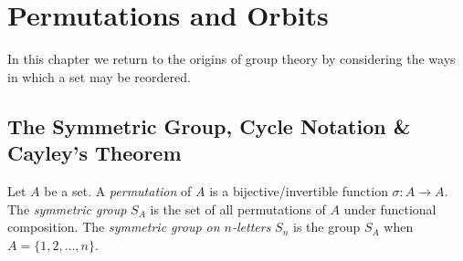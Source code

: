 \graphicspath{{4perm/asy/}}
\setcounter{section}{3}

\section{Permutations and Orbits}\label{chap:perm}

In this chapter we return to the origins of group theory by considering the ways in which a set may be reordered.

\subsection{The Symmetric Group, Cycle Notation \& Cayley's Theorem}\label{sec:perm1}

\begin{defn}{}{}
	Let $A$ be a set. A \emph{permutation} of $A$ is a bijective/invertible function $\sigma:A\to A$.\smallbreak
	The \emph{symmetric group} $S_A$ is the set of all permutations of $A$ under functional composition.\smallbreak
	The \emph{symmetric group on $n$-letters\footnotemark} $S_n$ is the group $S_A$ when $A=\{1,2,\ldots,n\}$.
\end{defn}



